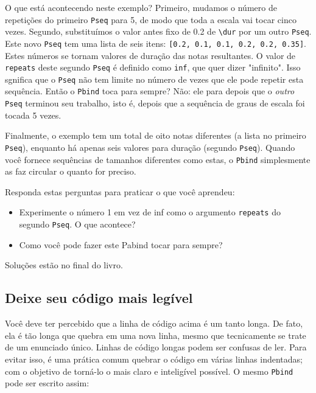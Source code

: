 O que está acontecendo neste exemplo? Primeiro, mudamos o número de repetições do primeiro \texttt{Pseq} para 5, de modo que toda a escala vai tocar cinco vezes. Segundo, substituímos o valor antes fixo de 0.2 de \texttt{\textbackslash dur} por um outro \texttt{Pseq}. Este novo \texttt{Pseq} tem uma lista de seis itens: \texttt{[0.2, 0.1, 0.1, 0.2, 0.2, 0.35]}. Estes números se tornam valores de duração das notas resultantes. O valor de \texttt{repeats} deste segundo \texttt{Pseq} é definido como \texttt{inf}, que quer dizer "infinito". Isso sgnifica que o \texttt{Pseq} não tem limite no número de vezes que ele pode repetir esta sequência. Então o \texttt{Pbind} toca para sempre? Não: ele para depois que o \emph{outro} \texttt{Pseq} terminou seu trabalho, isto é, depois que a sequência de graus de escala foi tocada 5 vezes.

Finalmente, o exemplo tem um total de oito notas diferentes (a lista no primeiro \texttt{Pseq}), enquanto há apenas seis valores para duração (segundo \texttt{Pseq}). Quando você fornece sequências de tamanhos diferentes como estas, o \texttt{Pbind} simplesmente as faz circular o quanto for preciso.

Responda estas perguntas para praticar o que você aprendeu:
\begin{itemize}
\item Experimente o número 1 em vez de inf como o argumento \texttt{repeats} do segundo \texttt{Pseq}. O que acontece?
\item Como você pode fazer este Pabind tocar para sempre?
\end{itemize}

Soluções estão no final do livro.

\subsection{Deixe seu código mais legível}

Você deve ter percebido que a linha de código acima é um tanto longa. De fato, ela é tão longa que quebra em uma nova linha, mesmo que tecnicamente se trate de um enunciado único. Linhas de código longas podem ser confusas de ler. Para evitar isso, é uma prática comum quebrar o código em várias linhas indentadas; com o objetivo de torná-lo o mais claro e inteligível possível. O mesmo \texttt{Pbind} pode ser escrito assim:


